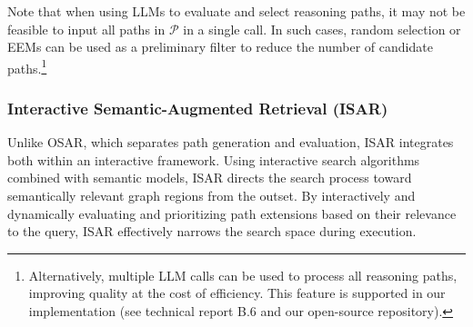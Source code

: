 {
Note that when using LLMs to evaluate and select reasoning paths, it may not be feasible to input all paths in \(\mathcal{P}\) in a single call.
In such cases, random selection or EEMs can be used as a preliminary filter to reduce the number of candidate paths.\footnote{Alternatively, multiple LLM calls can be used to process all reasoning paths, improving quality at the cost of efficiency. 
This feature is supported in our implementation (see technical report B.6 and our open-source repository).
}

\subsubsection{{\bf Interactive Semantic-Augmented Retrieval ({\bf ISAR})}} 
\label{subsubsec:ISAR}

Unlike OSAR, which separates path generation and evaluation, ISAR integrates both within an interactive framework. 
Using interactive search algorithms {\cite{BeamSearch,DiverseBeamSearch,ContrastiveSearch}} combined with semantic models, ISAR directs the search process toward semantically relevant graph regions from the outset. By interactively and dynamically evaluating and prioritizing path extensions based on their relevance to the query, ISAR effectively narrows the search space during execution.

}
